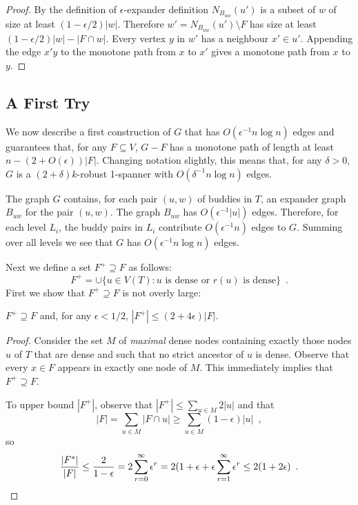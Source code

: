 \documentclass{patmorin}
\begin{document}
\begin{proof}
  By the definition of $\epsilon$-expander definition
  $N_{B_{uw}}(u')$ is a subset of $w$ of size at least
  $(1-\epsilon/2)|w|$. Therefore  $w'=N_{B_{uw}}(u')\setminus F$ has
  size at least $(1-\epsilon/2)|w|-|F\cap w|$.  Every vertex $y$ in $w'$
  has a neighbour $x'\in u'$. Appending the edge $x'y$ to the monotone
  path from $x$ to $x'$ gives a monotone path from $x$ to $y$.
\end{proof}
   
	
\subsection{A First Try}

We now describe a first construction of $G$ that has $O(\epsilon^{-1}n\log
n)$ edges and guarantees that, for any $F\subseteq V$,  $G-F$ has a
monotone path of length at least $n-(2+O(\epsilon))|F|$.  Changing
notation slightly, this means that, for any $\delta >0$, $G$ is a
$(2+\delta)k$-robust 1-spanner with $O(\delta^{-1}n\log n)$ edges.

The graph $G$ contains, for each pair $(u,w)$ of buddies in $T$, an
expander graph $B_{uw}$ for the pair $(u,w)$.  The graph $B_{uw}$ has $O(\epsilon^{-1}|u|)$ edges. Therefore, for each level $L_i$, the buddy pairs in $L_i$ contribute $O(\epsilon^{-1} n)$ edges to $G$.  Summing over all levels we see that $G$ has $O(\epsilon^{-1}n\log n)$ edges.

Next we define a set $F^+\supseteq F$ as follows: 
\[
	F^+ = \cup\{ u\in V(T): \text{$u$ is dense or $r(u)$ is dense}\} \enspace .
\]
First we show that $F^+\supseteq F$ is not overly large:

\begin{clm}
  $F^+\supseteq F$ and, for any $\epsilon < 1/2$, $|F^+|\le (2+4\epsilon)|F|$.
\end{clm}

\begin{proof}
  Consider the set $M$ of \emph{maximal} dense nodes containing exactly
  those nodes $u$ of $T$ that are dense and such that no strict ancestor
  of $u$ is dense.  Observe that every $x\in F$ appears in exactly one
  node of $M$.  This immediately implies that $F^+\supseteq F$.

  To upper bound $|F^+|$, observe that $|F^+| \le \sum_{u\in M} 2|u|$
  and that 
  \[ 
     |F| = \sum_{u\in M} |F\cap u| \ge \sum_{u\in M} (1-\epsilon)|u| \enspace , 
  \]
	so
  \[
    \frac{|F^*|}{|F|} 
      \le \frac{2}{1-\epsilon} 
	= 2\sum_{r=0}^\infty\epsilon^r 
	= 2(1+\epsilon + \epsilon\sum_{r=1}^\infty \epsilon^r 
	\le 2(1+2\epsilon) \enspace . \qedhere
  \]
\end{proof}
\end{document}
